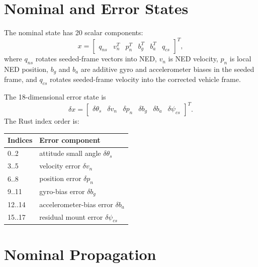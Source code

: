 \documentclass[11pt]{article}
\newcommand{\T}{^{T}}
\begin{document}
\section{Nominal and Error States}

The nominal state has 20 scalar components:
\begin{equation}
  x=
  \begin{bmatrix}
  q_{ns} & v_n\T & p_n\T & b_g\T & b_a\T & q_{cs}
  \end{bmatrix}\T ,
\end{equation}
where \(q_{ns}\) rotates seeded-frame vectors into NED, \(v_n\) is NED
velocity, \(p_n\) is local NED position, \(b_g\) and \(b_a\) are additive gyro
and accelerometer biases in the seeded frame, and \(q_{cs}\) rotates
seeded-frame velocity into the corrected vehicle frame.

The 18-dimensional error state is
\begin{equation}
  \delta x =
  \begin{bmatrix}
  \delta\theta_s &
  \delta v_n &
  \delta p_n &
  \delta b_g &
  \delta b_a &
  \delta\psi_{cs}
  \end{bmatrix}\T .
\end{equation}
The Rust index order is:
\begin{center}
\begin{tabular}{ll}
\toprule
Indices & Error component \\
\midrule
0..2 & attitude small angle \(\delta\theta_s\) \\
3..5 & velocity error \(\delta v_n\) \\
6..8 & position error \(\delta p_n\) \\
9..11 & gyro-bias error \(\delta b_g\) \\
12..14 & accelerometer-bias error \(\delta b_a\) \\
15..17 & residual mount error \(\delta\psi_{cs}\) \\
\bottomrule
\end{tabular}
\end{center}

\section{Nominal Propagation}
\end{document}
